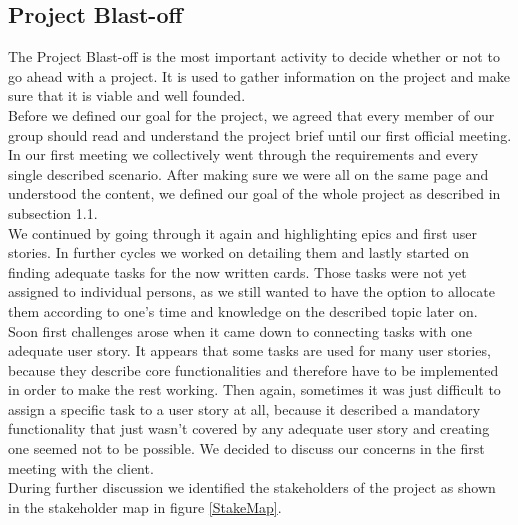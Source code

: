 \subsection{Project Blast-off}

The Project Blast-off is the most important activity to decide whether or not to go ahead with a project. It is used to gather information on the project and make sure that it is viable and well founded. \\ 
Before we defined our goal for the project, we agreed that every member of our group should read and understand the project brief until our first official meeting. In our first meeting we collectively went through the requirements and every single described scenario. After making sure we were all on the same page and understood the content, we defined our goal of the whole project as described in subsection 1.1. \\ 
We continued by going through it again and highlighting epics and first user stories. In further cycles we worked on detailing them and lastly started on finding adequate tasks for the now written cards. Those tasks were not yet assigned to individual persons, as we still wanted to have the option to allocate them according to one’s time and knowledge on the described topic later on. Soon first challenges arose when it came down to connecting tasks with one adequate user story. It appears that some tasks are used for many user stories, because they describe core functionalities and therefore have to be implemented in order to make the rest working. Then again, sometimes it was just difficult to assign a specific task to a user story at all, because it described a mandatory functionality that just wasn’t covered by any adequate user story and creating one seemed not to be possible. We decided to discuss our concerns in the first meeting with the client.\\ 
During further discussion we identified the stakeholders of the project as shown in the stakeholder map in figure \ref{StakeMap}. \\

